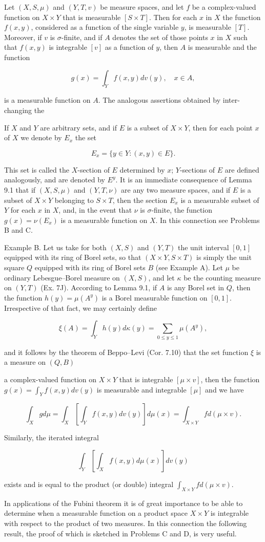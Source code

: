 Let $(X, S, \mu)$ and $(Y, T, v)$ be measure spaces, and let $f$ be a complex-valued function on $X \times Y$ that is measurable $[S \times T]$. Then for each $x$ in $X$ the function $f(x, y)$, considered as a function of the single variable $y$, is measurable $[T]$. Moreover, if $v$ is $\sigma$-finite, and if $A$ denotes the set of those points $x$ in $X$ such that $f(x, y)$ is integrable $[v]$ as a function of $y$, then $A$ is measurable and the function

$$g(x) = \int_Y f(x, y)dv(y), \quad x \in A,$$

is a measurable function on $A$. The analogous assertions obtained by inter-changing the

If $X$ and $Y$ are arbitrary sets, and if $E$ is a subset of $X \times Y$, then for each point $x$ of $X$ we denote by $E_x$ the set

$$E_x = \{y \in Y : (x, y) \in E\}.$$

This set is called the $X$-section of $E$ determined by $x$; $Y$-sections of $E$ are defined analogously, and are denoted by $E^y$. It is an immediate consequence of Lemma 9.1 that if $(X, S, \mu)$ and $(Y, T, \nu)$ are any two measure spaces, and if $E$ is a subset of $X \times Y$ belonging to $S \times T$, then the section $E_x$ is a measurable subset of $Y$ for each $x$ in $X$, and, in the event that $\nu$ is $\sigma$-finite, the function $g(x) = \nu(E_x)$ is a measurable function on $X$. In this connection see Problems B and C.

Example B. Let us take for both $(X, S)$ and $(Y, T)$ the unit interval $[0, 1]$ equipped with its ring of Borel sets, so that $(X \times Y, S \times T)$ is simply the unit square $Q$ equipped with its ring of Borel sets $B$ (see Example A). Let $\mu$ be ordinary Lebesgue–Borel measure on $(X, S)$, and let $\kappa$ be the counting measure on $(Y, T)$ (Ex. 7J). According to Lemma 9.1, if $A$ is any Borel set in $Q$, then the function $h(y) = \mu(A^y)$ is a Borel measurable function on $[0, 1]$. Irrespective of that fact, we may certainly define

$$\xi(A) = \int_Y h(y) d\kappa(y) = \sum_{0 \leq y \leq 1} \mu(A^y),$$

and it follows by the theorem of Beppo–Levi (Cor. 7.10) that the set function $\xi$ is a measure on $(Q, B)$

a complex-valued function on $X \times Y$ that is integrable $[\mu \times v]$, then the function $g(x) = \int_Y f(x, y)dv(y)$ is measurable and integrable $[\mu]$ and we have

$$\int_X g d\mu = \int_X \left[ \int_Y f(x, y)dv(y) \right] d\mu(x) = \int_{X \times Y} f d(\mu \times v).$$

Similarly, the iterated integral

$$\int_Y \left[ \int_X f(x, y)d\mu(x) \right] dv(y)$$

exists and is equal to the product (or double) integral $\int_{X \times Y} f d(\mu \times v)$.

In applications of the Fubini theorem it is of great importance to be able to determine when a measurable function on a product space $X \times Y$ is integrable with respect to the product of two measures. In this connection the following result, the proof of which is sketched in Problems C and D, is very useful.
